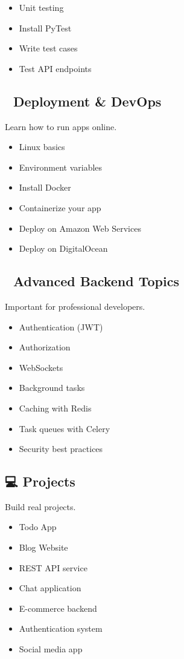 \documentclass{article}
\begin{document}
\begin{itemize}[label=$\square$]
    \item Unit testing
    \item Install PyTest
    \item Write test cases
    \item Test API endpoints
\end{itemize}

\subsection*{🐳 Deployment \& DevOps}
Learn how to run apps online.

\begin{itemize}[label=$\square$]
    \item Linux basics
    \item Environment variables
    \item Install Docker
    \item Containerize your app
    \item Deploy on Amazon Web Services
    \item Deploy on DigitalOcean
\end{itemize}

\subsection*{🧠 Advanced Backend Topics}
Important for professional developers.

\begin{itemize}[label=$\square$]
    \item Authentication (JWT)
    \item Authorization
    \item WebSockets
    \item Background tasks
    \item Caching with Redis
    \item Task queues with Celery
    \item Security best practices
\end{itemize}

\subsection*{💻 Projects}
Build real projects.

\begin{itemize}[label=$\square$]
    \item Todo App
    \item Blog Website
    \item REST API service
    \item Chat application
    \item E-commerce backend
    \item Authentication system
    \item Social media app
\end{itemize}
\end{document}
